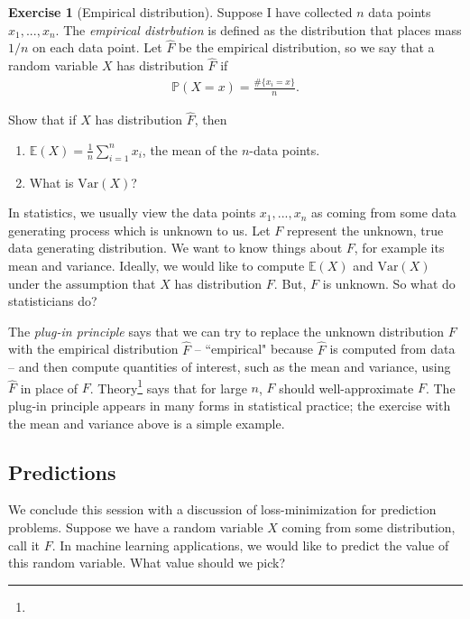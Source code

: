 \documentclass[11pt]{article}
\theoremstyle{definition}
\newtheorem{exercise}[]{Exercise}
\renewcommand{\P}{\mathbb{P}}
\newcommand{\E}{\mathbb{E}}
\newcommand{\V}{\text{Var}}
\begin{document}
\begin{exercise}[Empirical distribution]
Suppose I have collected $n$ data points $x_1, ..., x_n$. The \textit{empirical distrbution}
is defined as the distribution that places mass $1 / n$ on each data point.
Let $\hat F$ be the empirical distribution, so we say that a random variable $X$
has distribution $\hat F$ if
\begin{align*}
  \P(X = x) = \frac{\#\{x_i = x\}}{n}.
\end{align*}

Show that if $X$ has distribution $\hat F$, then
\begin{enumerate}[label = (\alph*)]
  \item $\E(X) = \frac{1}{n}\sum_{i=1}^n x_i$, the mean of the $n$-data points.
  \item What is $\V(X)$?
\end{enumerate}
\label{exer:empirical}
\end{exercise}

In statistics, we usually view the data points $x_1, ..., x_n$ as coming from some
data generating process which is unknown to us. Let $F$ represent the unknown, true
data generating distribution. We want to know things about $F$, for example its mean
and variance. Ideally, we would like to compute $\E(X)$ and $\V(X)$ under the assumption
that $X$ has distribution $F$. But, $F$ is unknown. So what do statisticians do?

The \textit{plug-in principle} says that we can try to replace the unknown
distribution $F$ with the empirical distribution $\hat F$ -- ``empirical" because
$\hat F$ is computed from data -- and then compute quantities of interest,
such as the mean and variance,
using $\hat F$ in place of $F$.
Theory\footnote{} says that for large $n$, $\hat F$ should well-approximate $F$.
The plug-in principle
appears in many forms in statistical practice; the exercise with the mean and variance above
is a simple example.

\subsection{Predictions}

We conclude this session with a discussion of loss-minimization for prediction problems.
Suppose we have a random variable $X$ coming from some distribution, call it $F$.
In machine learning applications, we would like to predict the value of this random variable.
What value should we pick?
\end{document}
